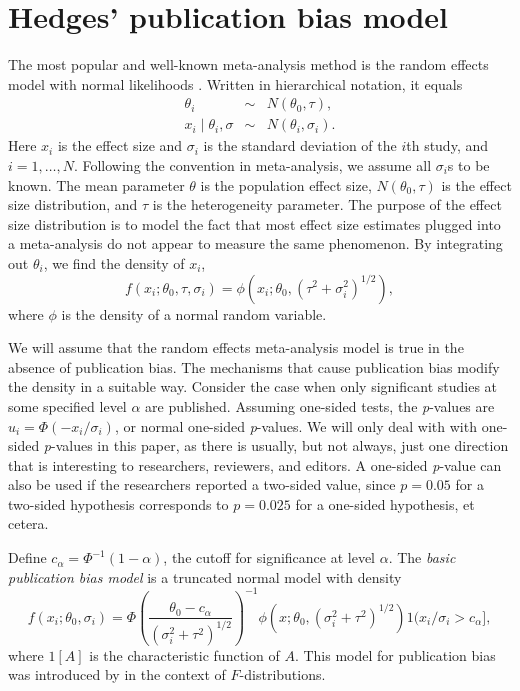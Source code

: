 \documentclass[article]{ajs}
\numberwithin{equation}{section}
\numberwithin{figure}{section}
\theoremstyle{plain}
\theoremstyle{definition}
\theoremstyle{definition}
\theoremstyle{plain}
\renewcommand{\sqrt}[1]{{(#1)^{1/2}}}
\begin{document}
\section{Hedges' publication bias model}

The most popular and well-known meta-analysis method is the random effects model with normal likelihoods \citep{hedges1998fixed}. Written in hierarchical notation, it equals
\begin{eqnarray*}
\theta_{i} & \sim & N(\theta_{0},\tau),\\
x_{i}\mid\theta_{i},\sigma & \sim & N(\theta_{i},\sigma_{i}).
\end{eqnarray*}
Here $x_{i}$ is the effect size and $\sigma_{i}$ is the standard deviation of the $i$th study, and $i=1,\ldots,N$. Following the convention in meta-analysis, we assume all $\sigma_{i}$s to be known. The mean parameter $\theta$ is the population effect size, $N(\theta_{0},\tau)$ is the effect size distribution, and $\tau$ is the heterogeneity parameter. The purpose of the effect size distribution is to model the fact that most effect size estimates plugged into a meta-analysis do not appear to measure the same phenomenon. By integrating out $\theta_{i}$, we find the density of $x_{i}$,
\[
f(x_{i};\theta_{0},\tau,\sigma_{i})=\phi(x_{i};\theta_{0},\sqrt{\tau^{2}+\sigma_{i}^{2}}),
\]
where $\phi$ is the density of a normal random variable. 

We will assume that the random effects meta-analysis model is true in the absence of publication bias. The mechanisms that cause publication bias modify the density in a suitable way. Consider the case when only significant studies at some specified level $\alpha$ are published. Assuming one-sided tests, the \textit{p}-values are $u_{i}=\Phi(-x_{i}/\sigma_{i})$, or normal one-sided \textit{p}-values. We will only deal with with one-sided \textit{p}-values in this paper, as there is usually, but not always, just one direction that is interesting to researchers, reviewers, and editors. A one-sided \textit{p}-value can also be used if the researchers reported a two-sided value, since $p=0.05$ for a two-sided hypothesis corresponds to $p=0.025$ for a one-sided hypothesis, et cetera.

Define $c_{\alpha}=\Phi^{-1}(1-\alpha)$, the cutoff for significance at level $\alpha$. The \emph{basic publication bias model} is a truncated normal model with density
\begin{equation}
f(x_{i};\theta_{0},\sigma_{i})=\Phi\left(\frac{\theta_{0}-c_{\alpha}}{\sqrt{\sigma_{i}^{2}+\tau^{2}}}\right)^{-1}\phi(x;\theta_{0},\sqrt{\sigma_{i}^{2}+\tau^{2}})1(x_{i}/\sigma_{i}>c_{\alpha}],\label{eq:selection for significance model}
\end{equation}
where $1[A]$ is the characteristic function of $A$. This model for publication bias was introduced by \citet{hedges1984estimation} in the context of $F$-distributions.
\end{document}
